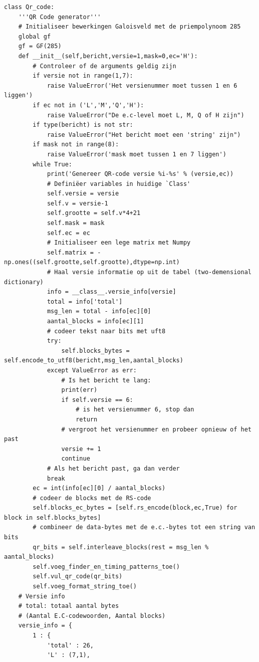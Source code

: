 \documentclass{article}
\begin{document}
\begin{verbatim}
class Qr_code:
    '''QR Code generator'''
    # Initialiseer bewerkingen Galoisveld met de priempolynoom 285
    global gf
    gf = GF(285)
    def __init__(self,bericht,versie=1,mask=0,ec='H'):
        # Controleer of de arguments geldig zijn
        if versie not in range(1,7):
            raise ValueError('Het versienummer moet tussen 1 en 6 liggen')
        if ec not in ('L','M','Q','H'):
            raise ValueError("De e.c-level moet L, M, Q of H zijn")
        if type(bericht) is not str:
            raise ValueError("Het bericht moet een 'string' zijn")
        if mask not in range(8):
            raise ValueError('mask moet tussen 1 en 7 liggen')
        while True:
            print('Genereer QR-code versie %i-%s' % (versie,ec))
            # Definiëer variables in huidige `Class'
            self.versie = versie
            self.v = versie-1
            self.grootte = self.v*4+21
            self.mask = mask
            self.ec = ec
            # Initialiseer een lege matrix met Numpy
            self.matrix = -np.ones((self.grootte,self.grootte),dtype=np.int)
            # Haal versie informatie op uit de tabel (two-demensional dictionary)
            info = __class__.versie_info[versie]
            total = info['total']
            msg_len = total - info[ec][0]
            aantal_blocks = info[ec][1]
            # codeer tekst naar bits met uft8
            try:
                self.blocks_bytes = self.encode_to_utf8(bericht,msg_len,aantal_blocks)
            except ValueError as err:
                # Is het bericht te lang:
                print(err)
                if self.versie == 6:
                    # is het versienummer 6, stop dan
                    return
                # vergroot het versienummer en probeer opnieuw of het past
                versie += 1
                continue
            # Als het bericht past, ga dan verder
            break
        ec = int(info[ec][0] / aantal_blocks)
        # codeer de blocks met de RS-code
        self.blocks_ec_bytes = [self.rs_encode(block,ec,True) for block in self.blocks_bytes]
        # combineer de data-bytes met de e.c.-bytes tot een string van bits
        qr_bits = self.interleave_blocks(rest = msg_len % aantal_blocks)
        self.voeg_finder_en_timing_patterns_toe()
        self.vul_qr_code(qr_bits)
        self.voeg_format_string_toe()
    # Versie info
    # total: totaal aantal bytes
    # (Aantal E.C-codewoorden, Aantal blocks)
    versie_info = {
        1 : {
            'total' : 26,
            'L' : (7,1),

\end{verbatim}
\end{document}
